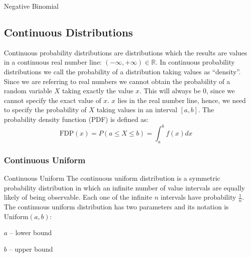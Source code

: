\begin{frame}{Negative Binomial}
	\centering
\end{frame}


\subsection{Continuous Distributions}
\begin{frame}
	\begin{defn}
		\small
		Continuous probability distributions are distributions which
		the results are values in a continuous real number line:
		$(-\infty, +\infty) \in \mathbb{R}$.
		In continuous probability distributions we call the probability
		of a distribution taking values as ``density''.
		Since we are referring to real numbers we cannot obtain the
		probability of a random variable $X$ taking exactly the value $x$.
		This will always be $0$, since we cannot specify the exact
		value of $x$. $x$ lies in the real number line, hence,
		we need to specify the probability of $X$ taking values in an
		interval $[a,b]$.
		The probability density function (PDF) is defined as:
		$$\text{FDP}(x) = P(a \leq X \leq b) = \int_a^b f(x) dx$$
	\end{defn}
\end{frame}

\subsubsection{Continuous Uniform}
\begin{frame}{Continuous Uniform}
	The continuous uniform distribution is a symmetric probability distribution
	in which an infinite number of value intervals are equally likely of being observable.
	Each one of the infinite $n$ intervals have probability $\frac{1}{n}$.
	\vfill
	The continuous uniform distribution has two parameters and its notation is $\text{Uniform}(a, b)$:
	\begin{vfilleditems}
		\item $a$ -- lower bound
		\item $b$ -- upper bound
	\end{vfilleditems}
\end{frame}

